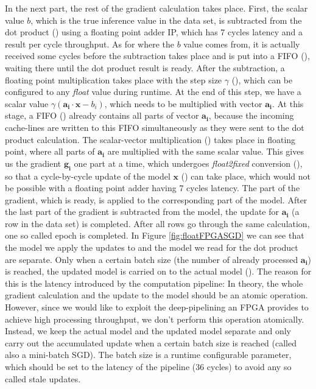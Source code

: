 \documentclass{article}
\newcommand*\circled[1]{\tikz[baseline=(char.base)]{
\node[shape=circle,draw,color=black,text=black,inner sep=0.05pt](char){#1};}}
\begin{document}
In the next part, the rest of the gradient calculation takes place. First, the scalar value $b$, which is the true inference value in the data set, is subtracted from the dot product (\circled{6}) using a floating point adder IP, which has 7 cycles latency and a result per cycle throughput. As for where the $b$ value comes from, it is actually received some cycles before the subtraction takes place and is put into a FIFO (\circled{B}), waiting there until the dot product result is ready. After the subtraction, a floating point multiplication takes place with the step size $\gamma$ (\circled{7}), which can be configured to any \textit{float} value during runtime. At the end of this step, we have a scalar value $\gamma(\mathbf{a_i}\cdot\mathbf{x}-b_i)$, which needs to be multiplied with vector $\mathbf{a_i}$. At this stage, a FIFO (\circled{A}) already contains all parts of vector $\mathbf{a_i}$, because the incoming cache-lines are written to this FIFO simultaneously as they were sent to the dot product calculation. The scalar-vector multiplication (\circled{8}) takes place in floating point, where all parts of $\mathbf{a_i}$ are multiplied with the same scalar value. This gives us the gradient $\mathbf{g_i}$ one part at a time, which undergoes \textit{float2fixed} conversion (\circled{9}), so that a cycle-by-cycle update of the model $\mathbf{x}$ (\circled{C}) can take place, which would not be possible with a floating point adder having 7 cycles latency. The part of the gradient, which is ready, is applied to the corresponding part of the model. After the last part of the gradient is subtracted from the model, the update for $\mathbf{a_i}$ (a row in the data set) is completed. After all rows go through the same calculation, one so called epoch is completed. In Figure \ref{fig:floatFPGASGD} we can see that the model we apply the updates to and the model we read for the dot product are separate. Only when a certain batch size (the number of already processed $\mathbf{a_i}$) is reached, the updated model is carried on to the actual model (\circled{D}). The reason for this is the latency introduced by the computation pipeline: In theory, the whole gradient calculation and the update to the model should be an atomic operation. However, since we would like to exploit the deep-pipelining an FPGA provides to achieve high processing throughput, we don't perform this operation atomically. Instead, we keep the actual model and the updated model separate and only carry out the accumulated update when a certain batch size is reached (called also a mini-batch SGD). The batch size is a runtime configurable parameter, which should be set to the latency of the pipeline (36 cycles) to avoid any so called stale updates.
\end{document}
